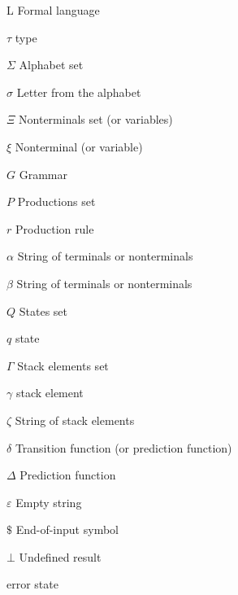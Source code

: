 \begin{abbrv}
\item[L] Formal language
\item[$τ$]  type
\item[$Σ$] Alphabet set
\item[$σ$] Letter from the alphabet
\item[$Ξ$] Nonterminals set (or variables)
\item[$ξ$] Nonterminal (or variable)
\item[$G$] Grammar
\item[$P$] Productions set
\item[$r$] Production rule
\item[$α$] String of terminals or nonterminals
\item[$β$] String of terminals or nonterminals
\item[$Q$] States set
\item[$q$] state
\item[$Γ$] Stack elements set
\item[$γ$] stack element
\item[$ζ$] String of stack elements
\item[$δ$] Transition function (or prediction function)
\item[$Δ$] Prediction function
\item[$ε$] Empty string
\item[$\$$] End-of-input symbol
\item[$⊥$] Undefined result

\item[\currency] error state
\end{abbrv}
